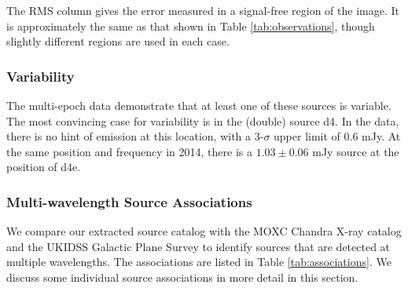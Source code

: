 The RMS column gives the error measured in a signal-free region of the image.
It is approximately the same as that shown in Table \ref{tab:observations},
though slightly different regions are used in each case.





\subsubsection{Variability}
\label{sec:variability}
The multi-epoch data demonstrate that at least one of these sources is
variable.  The most convincing case for variability is in the (double) source
d4.  In the \citet{Mehringer1994a} data, there is no
hint of emission at this location, with a 3-$\sigma$ upper limit of 0.6 mJy.
At the same position and frequency in 2014, there is a $1.03 \pm 0.06$ mJy
source at the position of d4e. 


\subsubsection{Multi-wavelength Source Associations}
\label{sec:associations}
We compare our extracted source catalog with the MOXC Chandra X-ray catalog
\citep{Townsley2014a} and the UKIDSS Galactic Plane Survey
\citep[UGPS;][]{Lucas2008a} to identify sources that are detected at multiple
wavelengths.  The associations are listed in Table
\ref{tab:associations}.  We discuss some
individual source associations in more detail in this section.

